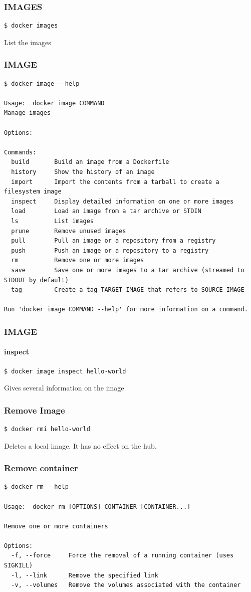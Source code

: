 \begin{frame}[fragile]
\frametitle{IMAGES}
\begin{lstlisting}
$ docker images
\end{lstlisting}

List the images 
\end{frame}

\begin{frame}[fragile]
\frametitle{IMAGE}
\scriptsize
\begin{lstlisting}[breaklines=true]
$ docker image --help

Usage:  docker image COMMAND
Manage images

Options:

Commands:
  build       Build an image from a Dockerfile
  history     Show the history of an image
  import      Import the contents from a tarball to create a filesystem image
  inspect     Display detailed information on one or more images
  load        Load an image from a tar archive or STDIN
  ls          List images
  prune       Remove unused images
  pull        Pull an image or a repository from a registry
  push        Push an image or a repository to a registry
  rm          Remove one or more images
  save        Save one or more images to a tar archive (streamed to STDOUT by default)
  tag         Create a tag TARGET_IMAGE that refers to SOURCE_IMAGE

Run 'docker image COMMAND --help' for more information on a command.
\end{lstlisting}
\normalsize
\end{frame}

\begin{frame}[fragile]
\frametitle{IMAGE}
\framesubtitle{inspect}
\begin{lstlisting}
$ docker image inspect hello-world
\end{lstlisting}

Gives several information on the image
\end{frame}


\begin{frame}[fragile]
\frametitle{Remove Image}
\begin{lstlisting}
$ docker rmi hello-world
\end{lstlisting}

Deletes a local image. It has no effect on the hub.
\end{frame}

\begin{frame}[fragile]
\frametitle{Remove container}
\scriptsize
\begin{lstlisting}[breaklines=true]
$ docker rm --help

Usage:  docker rm [OPTIONS] CONTAINER [CONTAINER...]

Remove one or more containers

Options:
  -f, --force     Force the removal of a running container (uses SIGKILL)
  -l, --link      Remove the specified link
  -v, --volumes   Remove the volumes associated with the container
\end{lstlisting}
\normalsize
\end{frame}

